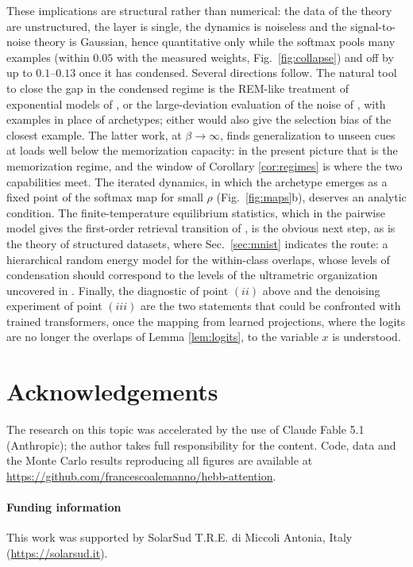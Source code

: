 \documentclass{SciPost}
\theoremstyle{plain}
\theoremstyle{definition}
\begin{document}
These implications are structural rather than numerical: the data of the theory are unstructured, the layer is single, the dynamics is noiseless and the signal-to-noise theory is Gaussian, hence quantitative only while the softmax pools many examples (within $0.05$ with the measured weights, Fig.\ \ref{fig:collapse}) and off by up to $0.1$--$0.13$ once it has condensed. Several directions follow. The natural tool to close the gap in the condensed regime is the REM-like treatment of exponential models of \cite{Lucibello2024}, or the large-deviation evaluation of the noise of \cite{Agliari2026hetero}, with examples in place of archetypes; either would also give the selection bias of the closest example. The latter work, at $\beta\to\infty$, finds generalization to unseen cues at loads well below the memorization capacity: in the present picture that is the memorization regime, and the window of Corollary \ref{cor:regimes} is where the two capabilities meet. The iterated dynamics, in which the archetype emerges as a fixed point of the softmax map for small $\rho$ (Fig.\ \ref{fig:maps}b), deserves an analytic condition. The finite-temperature equilibrium statistics, which in the pairwise model gives the first-order retrieval transition of \cite{Alemanno2023}, is the obvious next step, as is the theory of structured datasets, where Sec.\ \ref{sec:mnist} indicates the route: a hierarchical random energy model \cite{Derrida1985,DerridaGardner1986} for the within-class overlaps, whose levels of condensation should correspond to the levels of the ultrametric organization uncovered in \cite{Alemanno2023}. Finally, the diagnostic of point $(ii)$ above and the denoising experiment of point $(iii)$ are the two statements that could be confronted with trained transformers, once the mapping from learned projections, where the logits are no longer the overlaps of Lemma \ref{lem:logits}, to the variable $x$ is understood.

\section*{Acknowledgements}
The research on this topic was accelerated by the use of Claude Fable 5.1 (Anthropic); the author takes full responsibility for the content. Code, data and the Monte Carlo results reproducing all figures are available at \url{https://github.com/francescoalemanno/hebb-attention}.

\paragraph{Funding information}
This work was supported by SolarSud T.R.E. di Miccoli Antonia, Italy (\url{https://solarsud.it}).
\end{document}
